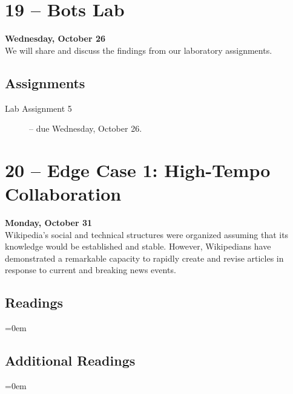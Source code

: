 \documentclass[11pt]{memoir}
\newenvironment{readinglist}{
\begin{list}{}{\leftmargin=8pt \itemindent=0em}
  \setlength{\itemsep}{8pt}
  \setlength{\parskip}{0em}
  \setlength{\parsep}{1em}
  \setlength{\parindent}{8em}}
{\end{list}}
\begin{document}
\section{19 -- Bots Lab}
\textcolor{CUGold}{\textbf{Wednesday, October 26}}\\
We will share and discuss the findings from our laboratory assignments.

    \subsection{Assignments}
    \begin{description}%
        \item[Lab Assignment 5 ] -- due Wednesday, October 26. 
    \end{description}
    
\section{20 -- Edge Case 1: High-Tempo Collaboration}
\textcolor{CUGold}{\textbf{Monday, October 31}}\\
Wikipedia's social and technical structures were organized assuming that its knowledge would be established and stable. However, Wikipedians have demonstrated a remarkable capacity to rapidly create and revise articles in response to current and breaking news events. 

    \subsection{Readings}
    \begin{readinglist}
        \item {}
        \item {}
    \end{readinglist}
    
    \subsection{Additional Readings}
    \begin{readinglist}
        \item {}
        \item {}
        \item {}
        \item {}
        \item {}
        \item {}
        \item {}
        \item {}
        \item {}
    \end{readinglist}
\end{document}
